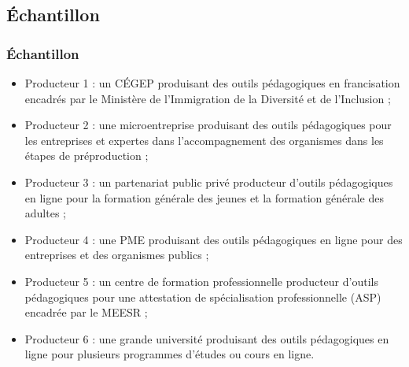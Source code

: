                        		 \subsection{Échantillon} 
					\begin{frame}[allowframebreaks]
						\frametitle{Échantillon}
                        
                        			\begin{itemize} 
                       				\item Producteur 1 : un CÉGEP produisant des outils pédagogiques en francisation encadrés par le Ministère de l’Immigration de la Diversité et de l'Inclusion ;
                       				\item Producteur 2 : une microentreprise produisant des outils pédagogiques pour les entreprises et expertes dans l’accompagnement des organismes dans les étapes de préproduction ;
							\item Producteur 3 : un partenariat public privé producteur d’outils pédagogiques en ligne pour la formation générale des jeunes et la formation générale des adultes ;
							\item Producteur 4 : une PME produisant des outils pédagogiques en ligne pour des entreprises et des organismes publics ;
							\item Producteur 5 : un centre de formation professionnelle producteur d’outils pédagogiques pour une attestation de spécialisation professionnelle (ASP) encadrée par le MEESR ;
							\item Producteur 6 : une grande université produisant des outils pédagogiques en ligne pour plusieurs programmes d’études ou cours en ligne.

                       		 \end{itemize}
                       		           
                \end{frame}
                       		 
